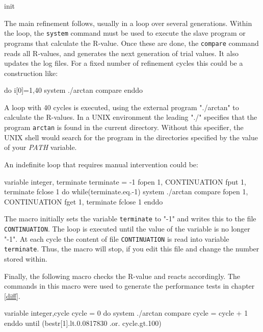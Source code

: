 \begin{MacVerbatim}
   init
\end{MacVerbatim}

The main refinement follows, usually in a loop over several generations.
Within the loop, the {\tt system} command must be used to execute the 
slave program or programs that calculate the R-value. Once these are 
done, the {\tt compare} command reads all R-values, and generates the
next generation of trial values. It also updates the log files. For a 
fixed number of refinement cycles this could be a construction like:

\begin{MacVerbatim}
   do i[0]=1,40
     system ./arctan
     compare
   enddo
\end{MacVerbatim}

A loop with 40 cycles is executed, using the external program "./arctan"
to calculate the R-values. In a UNIX environment the leading "./" 
specifies that the program {\tt arctan} is found in the current 
directory. Without this specifier, the UNIX shell would search for 
the program in the directories specified by the value of your 
{\em PATH} variable. 

An indefinite loop that requires manual intervention could be:

\begin{MacVerbatim}
   variable integer, terminate
   terminate = -1
   fopen 1, CONTINUATION
   fput  1, terminate
   fclose 1
   do while(terminate.eq.-1)
      system ./arctan
     compare
     fopen 1, CONTINUATION
     fget  1, terminate
     fclose 1
  enddo
\end{MacVerbatim}

The macro initially sets the variable {\tt terminate} to "-1" and 
writes this to the file {\tt CONTINUATION}. The loop is executed
until the value of the variable is no longer "-1". At each cycle
the content of file {\tt CONTINUATION} is read into variable 
{\tt terminate}. Thus, the macro will stop, if you edit this file
and change the number stored within.

Finally, the following macro checks the R-value and reacts accordingly.
The commands in this macro were used to generate the performance 
tests in chapter \ref{diff}.

\begin{MacVerbatim}
  variable integer,cycle
  cycle = 0
  do
    system ./arctan
    compare
    cycle = cycle + 1
  enddo until (bestr[1].lt.0.0817830 .or. cycle.gt.100)
\end{MacVerbatim}

